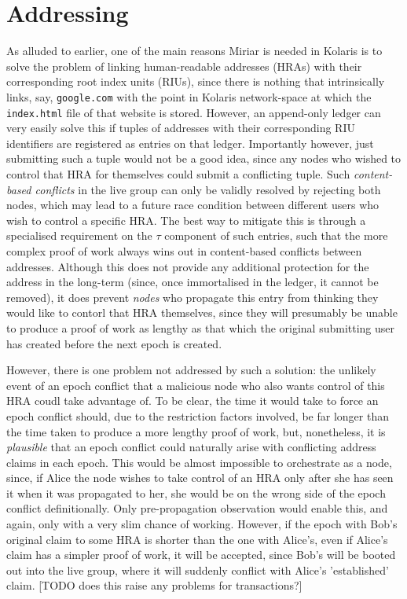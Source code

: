 \documentclass{extreport}
\begin{document}
\chapter{Addressing}
\label{sec:org9928c7d}

As alluded to earlier, one of the main reasons Miriar is needed in Kolaris is to solve the problem of linking human-readable addresses (HRAs) with their corresponding root index units (RIUs), since there is nothing that intrinsically links, say, \texttt{google.com} with the point in Kolaris network-space at which the \texttt{index.html} file of that website is stored. However, an append-only ledger can very easily solve this if tuples of addresses with their corresponding RIU identifiers are registered as entries on that ledger. Importantly however, just submitting such a tuple would not be a good idea, since any nodes who wished to control that HRA for themselves could submit a conflicting tuple. Such \emph{content-based conflicts} in the live group can only be validly resolved by rejecting both nodes, which may lead to a future race condition between different users who wish to control a specific HRA. The best way to mitigate this is through a specialised requirement on the \(\tau\) component of such entries, such that the more complex proof of work always wins out in content-based conflicts between addresses. Although this does not provide any additional protection for the address in the long-term (since, once immortalised in the ledger, it cannot be removed), it does prevent \emph{nodes} who propagate this entry from thinking they would like to contorl that HRA themselves, since they will presumably be unable to produce a proof of work as lengthy as that which the original submitting user has created before the next epoch is created.

However, there is one problem not addressed by such a solution: the unlikely event of an epoch conflict that a malicious node who also wants control of this HRA coudl take advantage of. To be clear, the time it would take to force an epoch conflict should, due to the restriction factors involved, be far longer than the time taken to produce a more lengthy proof of work, but, nonetheless, it is \emph{plausible} that an epoch conflict could naturally arise with conflicting address claims in each epoch. This would be almost impossible to orchestrate as a node, since, if Alice the node wishes to take control of an HRA only after she has seen it when it was propagated to her, she would be on the wrong side of the epoch conflict definitionally. Only pre-propagation observation would enable this, and again, only with a very slim chance of working. However, if the epoch with Bob's original claim to some HRA is shorter than the one with Alice's, even if Alice's claim has a simpler proof of work, it will be accepted, since Bob's will be booted out into the live group, where it will suddenly conflict with Alice's 'established' claim. [TODO does this raise any problems for transactions?]
\end{document}
